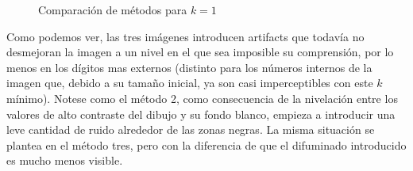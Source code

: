\begin{figure}[H]
    \centering
    \qquad
    \qquad
    \caption{Comparación de métodos para $k = 1$}
    \label{fig:example}
\end{figure}

Como podemos ver, las tres imágenes introducen artifacts que todavía no desmejoran la imagen a un nivel en el que sea imposible su comprensión, por lo menos en los dígitos mas externos (distinto para los números internos de la imagen que, debido a su tamaño inicial, ya son casi imperceptibles con este $k$ mínimo). Notese como el método 2, como consecuencia de la nivelación entre los valores de alto contraste del dibujo y su fondo blanco, empieza a introducir una leve cantidad de ruido alrededor de las zonas negras. La misma situación se plantea en el método tres, pero con la diferencia de que el difuminado introducido es mucho menos visible.


